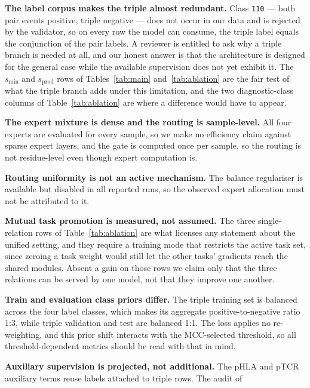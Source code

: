 \documentclass[webpdf,modern,large,namedate]{oup-authoring-template}
\theoremstyle{thmstyleone}
\theoremstyle{thmstyletwo}
\theoremstyle{thmstylethree}
\newcommand{\PH}{pHLA}
\newcommand{\PT}{pTCR}
\begin{document}
\begin{boxtext}[Limitations]
\begin{unlist}
\item \textbf{The label corpus makes the triple almost redundant.} Class
\texttt{110} --- both pair events positive, triple negative --- does not occur
in our data and is rejected by the validator, so on every row the model can
consume, the triple label equals the conjunction of the pair labels. A reviewer
is entitled to ask why a triple branch is needed at all, and our honest answer
is that the architecture is designed for the general case while the available
supervision does not yet exhibit it. The $s_{\min}$ and $s_{\mathrm{prod}}$
rows of Tables~\ref{tab:main} and~\ref{tab:ablation} are the fair test of what
the triple branch adds under this limitation, and the two diagnostic-class
columns of Table~\ref{tab:ablation} are where a difference would have to
appear.
\item \textbf{The expert mixture is dense and the routing is sample-level.}
All four experts are evaluated for every sample, so we make no efficiency claim
against sparse expert layers, and the gate is computed once per sample, so the
routing is not residue-level even though expert computation is.
\item \textbf{Routing uniformity is not an active mechanism.} The balance
regulariser is available but disabled in all reported runs, so the observed
expert allocation must not be attributed to it.
\item \textbf{Mutual task promotion is measured, not assumed.} The three
single-relation rows of Table~\ref{tab:ablation} are what licenses any
statement about the unified setting, and they require a training mode that
restricts the active task set, since zeroing a task weight would still let the
other tasks' gradients reach the shared modules. Absent a gain on those rows we
claim only that the three relations can be served by one model, not that they
improve one another.
\item \textbf{Train and evaluation class priors differ.} The triple training
set is balanced across the four label classes, which makes its aggregate
positive-to-negative ratio 1:3, while triple validation and test are balanced
1:1. The loss applies no re-weighting, and this prior shift interacts with the
MCC-selected threshold, so all threshold-dependent metrics should be read with
that in mind.
\item \textbf{Auxiliary supervision is projected, not additional.} The \PH{}
and \PT{} auxiliary terms reuse labels attached to triple rows. The audit of

\end{unlist}
\end{boxtext}
\end{document}
